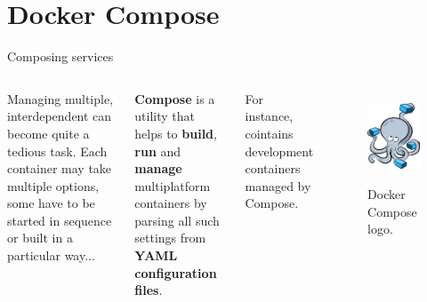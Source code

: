
\section{Docker Compose}
\graphicspath{{figs/section6/}}

\begin{frame}{Composing services}
	\begin{columns}
		Managing multiple, interdependent  can become quite a tedious task.
    \newline\newline
		Each container may take multiple options, some have to be started in sequence or built in a particular way...
		\begin{block}{}
			\centering
			\textbf{Compose} is a utility that helps to \textbf{build}, \textbf{run} and \textbf{manage} multiplatform containers by parsing all such settings from \textbf{YAML configuration files}.
		\end{block}
    For instance,  cointains development containers managed by Compose.

		\begin{figure}
			\centering
			\includegraphics[scale=.25]{composeLogo.png}
			\label{fig:compose}
			\caption{Docker Compose logo.}
		\end{figure}
	\end{columns}
\end{frame}

